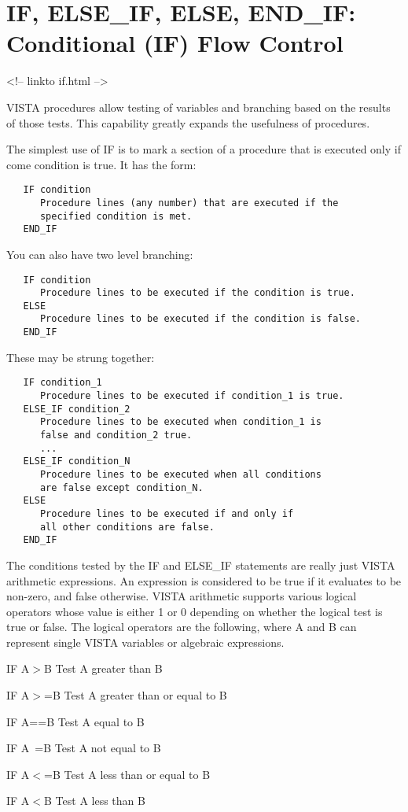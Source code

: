 \section{IF, ELSE\_IF, ELSE, END\_IF: Conditional (IF) Flow Control}
\begin{rawhtml}
<!-- linkto if.html -->
\end{rawhtml}


VISTA procedures allow testing of variables and branching based on the
results of those tests.  This capability greatly expands the usefulness of
procedures.

The simplest use of IF is to mark a section of a procedure that is executed
only if come condition is true.  It has the form:
\begin{verbatim}
   IF condition
      Procedure lines (any number) that are executed if the
      specified condition is met.
   END_IF
\end{verbatim}

You can also have two level branching:
\begin{verbatim}
   IF condition
      Procedure lines to be executed if the condition is true.
   ELSE
      Procedure lines to be executed if the condition is false.
   END_IF
\end{verbatim}

These may be strung together:
\begin{verbatim}
   IF condition_1
      Procedure lines to be executed if condition_1 is true.
   ELSE_IF condition_2
      Procedure lines to be executed when condition_1 is
      false and condition_2 true.
      ...
   ELSE_IF condition_N
      Procedure lines to be executed when all conditions
      are false except condition_N.
   ELSE
      Procedure lines to be executed if and only if
      all other conditions are false.
   END_IF
\end{verbatim}

The conditions tested by the IF and ELSE\_IF statements are really just
VISTA arithmetic expressions.  An expression is considered to be true if it
evaluates to be non-zero, and false otherwise.  VISTA arithmetic supports
various logical operators whose value is either 1 or 0 depending on whether
the logical test is true or false.  The logical operators are the
following, where A and B can represent single VISTA variables or algebraic
expressions.
\begin{example}
  \item[IF A$>$B\hfill]{Test A greater than B}
  \item[IF A$>$=B\hfill]{Test A greater than or equal to B}
  \item[IF A==B\hfill]{Test A equal to B}
  \item[IF A~=B\hfill]{Test A not equal to B}
  \item[IF A$<$=B\hfill]{Test A less than or equal to B}
  \item[IF A$<$B\hfill]{Test A less than B}
\end{example}

